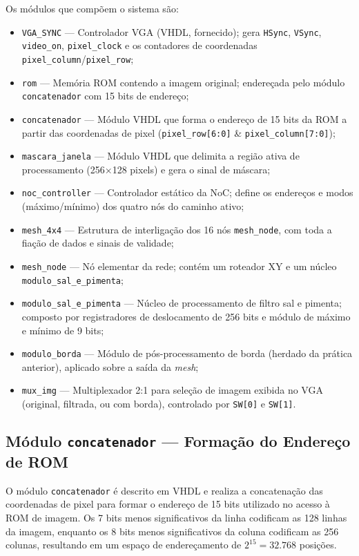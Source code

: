 \documentclass[12pt, a4paper]{article}
\begin{document}
	Os módulos que compõem o sistema são:
	
	\begin{itemize}
		\item \texttt{VGA\_SYNC} --- Controlador VGA (VHDL, fornecido); gera
		\texttt{HSync}, \texttt{VSync}, \texttt{video\_on}, \texttt{pixel\_clock}
		e os contadores de coordenadas \texttt{pixel\_column}/\texttt{pixel\_row};
		\item \texttt{rom} --- Memória ROM contendo a imagem original; endereçada
		pelo módulo \texttt{concatenador} com 15 bits de endereço;
		\item \texttt{concatenador} --- Módulo VHDL que forma o endereço de 15 bits
		da ROM a partir das coordenadas de pixel (\texttt{pixel\_row[6:0]} \&
		\texttt{pixel\_column[7:0]});
		\item \texttt{mascara\_janela} --- Módulo VHDL que delimita a região ativa
		de processamento (256$\times$128 pixels) e gera o sinal de máscara;
		\item \texttt{noc\_controller} --- Controlador estático da NoC; define os
		endereços e modos (máximo/mínimo) dos quatro nós do caminho ativo;
		\item \texttt{mesh\_4x4} --- Estrutura de interligação dos 16 nós
		\texttt{mesh\_node}, com toda a fiação de dados e sinais de validade;
		\item \texttt{mesh\_node} --- Nó elementar da rede; contém um roteador XY
		e um núcleo \texttt{modulo\_sal\_e\_pimenta};
		\item \texttt{modulo\_sal\_e\_pimenta} --- Núcleo de processamento de
		filtro sal e pimenta; composto por registradores de deslocamento de 256
		bits e módulo de máximo e mínimo de 9 bits;
		\item \texttt{modulo\_borda} --- Módulo de pós-processamento de borda
		(herdado da prática anterior), aplicado sobre a saída da \textit{mesh};
		\item \texttt{mux\_img} --- Multiplexador 2:1 para seleção de imagem
		exibida no VGA (original, filtrada, ou com borda), controlado por
		\texttt{SW[0]} e \texttt{SW[1]}.
	\end{itemize}
	
	\subsection{Módulo \texttt{concatenador} --- Formação do Endereço de ROM}
	
	O módulo \texttt{concatenador} é descrito em VHDL e realiza a concatenação
	das coordenadas de pixel para formar o endereço de 15 bits utilizado no acesso
	à ROM de imagem. Os 7 bits menos significativos da linha codificam as 128 linhas
	da imagem, enquanto os 8 bits menos significativos da coluna codificam as 256
	colunas, resultando em um espaço de endereçamento de $2^{15} = 32.768$ posições.
	
\end{document}
